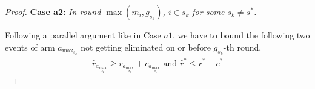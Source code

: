 \begin{proof}
\textbf{Case a2:} \textit{In round $\max(m_{i},g_{s_{k}})$, ${i} \in s_k$ for some $s_k \ne s^{*}$.}

%
%
%
%  
%   
% 
% 
%

Following a parallel argument like in Case $a1$, we have to bound the following two events of arm $a_{\max_{s_{k}}}$ not getting eliminated on or before $g_{s_{k}}$-th round,
\begin{align*}
  \hat{r}_{a_{\max_{s_{k}}}} \geq r_{a_{\max_{s_{k}}}} +c_{a_{\max_{s_{k}}}} \text{ and } \hat{r}^{*} \leq r^{*} -c^{*}  
\end{align*} 


\end{proof}
